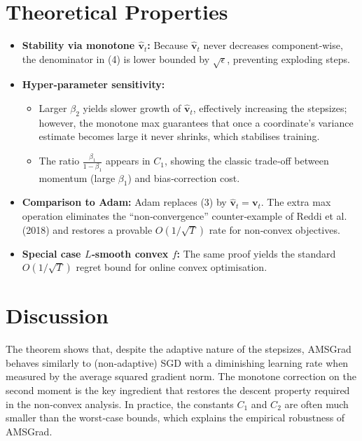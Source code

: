 \documentclass{article}
\begin{document}
\section*{Theoretical Properties}
\begin{itemize}
\item \textbf{Stability via monotone $\widehat{\mathbf{v}}_t$:} Because $\widehat{\mathbf{v}}_t$ never decreases component‑wise, the denominator in (4) is lower bounded by $\sqrt{\epsilon}$, preventing exploding steps.
\item \textbf{Hyper‑parameter sensitivity:}
    \begin{itemize}
        \item Larger $\beta_2$ yields slower growth of $\widehat{\mathbf{v}}_t$, effectively increasing the stepsizes; however, the monotone max guarantees that once a coordinate’s variance estimate becomes large it never shrinks, which stabilises training.
        \item The ratio $\frac{\beta_1}{1-\beta_1}$ appears in $C_1$, showing the classic trade‑off between momentum (large $\beta_1$) and bias‑correction cost.
    \end{itemize}
\item \textbf{Comparison to Adam:} Adam replaces (3) by $\widehat{\mathbf{v}}_t=\mathbf{v}_t$. The extra max operation eliminates the “non‑convergence” counter‑example of Reddi et al. (2018) and restores a provable $O(1/\sqrt{T})$ rate for non‑convex objectives.
\item \textbf{Special case $L$‑smooth convex $f$:} The same proof yields the standard $O(1/\sqrt{T})$ regret bound for online convex optimisation.
\end{itemize}

\section*{Discussion}
The theorem shows that, despite the adaptive nature of the stepsizes, AMSGrad behaves similarly to (non‑adaptive) SGD with a diminishing learning rate when measured by the average squared gradient norm. The monotone correction on the second moment is the key ingredient that restores the descent property required in the non‑convex analysis. In practice, the constants $C_1$ and $C_2$ are often much smaller than the worst‑case bounds, which explains the empirical robustness of AMSGrad.

\newpage
\end{document}
